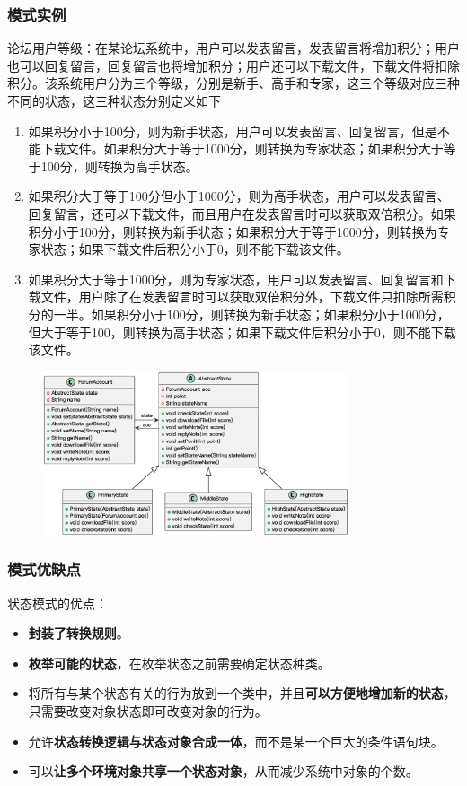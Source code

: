 \subsubsection{模式实例}
论坛用户等级：在某论坛系统中，用户可以发表留言，发表留言将增加积分；用户也可以回复留言，回复留言也将增加积分；用户还可以下载文件，下载文件将扣除积分。该系统用户分为三个等级，分别是新手、高手和专家，这三个等级对应三种不同的状态，这三种状态分别定义如下
\begin{enumerate}[label=(\arabic*)]
    \item 如果积分小于100分，则为新手状态，用户可以发表留言、回复留言，但是不能下载文件。如果积分大于等于1000分，则转换为专家状态；如果积分大于等于100分，则转换为高手状态。
    \item 如果积分大于等于100分但小于1000分，则为高手状态，用户可以发表留言、回复留言，还可以下载文件，而且用户在发表留言时可以获取双倍积分。如果积分小于100分，则转换为新手状态；如果积分大于等于1000分，则转换为专家状态；如果下载文件后积分小于0，则不能下载该文件。
    \item 如果积分大于等于1000分，则为专家状态，用户可以发表留言、回复留言和下载文件，用户除了在发表留言时可以获取双倍积分外，下载文件只扣除所需积分的一半。如果积分小于100分，则转换为新手状态；如果积分小于1000分，但大于等于100，则转换为高手状态；如果下载文件后积分小于0，则不能下载该文件。
\end{enumerate}
\begin{figure}[H]
    \vspace{-0.5em}
	\centering
	\includegraphics[width=0.8\textwidth]{images/状态模式实例.eps}
    \vspace{-1em}
\end{figure}

\subsubsection{模式优缺点}
状态模式的优点：
\begin{itemize}
    \item \textbf{封装了转换规则}。
    \item \textbf{枚举可能的状态}，在枚举状态之前需要确定状态种类。
    \item 将所有与某个状态有关的行为放到一个类中，并且\textbf{可以方便地增加新的状态}，只需要改变对象状态即可改变对象的行为。
    \item 允许\textbf{状态转换逻辑与状态对象合成一体}，而不是某一个巨大的条件语句块。
    \item 可以\textbf{让多个环境对象共享一个状态对象}，从而减少系统中对象的个数。
\end{itemize}

